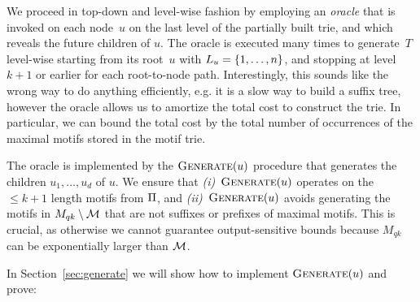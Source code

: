 We proceed in top-down and level-wise fashion by employing an \emph{oracle} that is invoked on each node~$u$ on the last level of the partially built trie, and which reveals the future children of $u$. The oracle is executed many times to generate~$T$ level-wise starting from its root~$u$ with $L_{u} = \{1,\dots, n\}$, and stopping at level $k+1$ or earlier for each root-to-node path. 
Interestingly, this sounds like the wrong way to do anything efficiently, e.g. it is a slow way to build a suffix tree, however the oracle allows us to amortize the total cost to construct the trie. In particular, we can bound the total cost by the total number of occurrences of the maximal motifs stored in the motif trie. 


The oracle is implemented by the $\operatorname{\textsc{Generate}}(u)$ procedure that generates the children $u_1, \ldots, u_d$ of $u$. We ensure that \emph{(i)}~$\operatorname{\textsc{Generate}}(u)$ operates on the $\leq k+1$ length motifs from $\Pi$, and \emph{(ii)}~$\operatorname{\textsc{Generate}}(u)$ avoids generating the motifs in $M_{qk} \setminus \mathcal{M}$ that are not suffixes or prefixes of maximal motifs. This is crucial, as otherwise we cannot guarantee output-sensitive bounds because $M_{qk}$ can be exponentially larger than $\mathcal{M}$.

In Section~\ref{sec:generate} we will show how to implement $\operatorname{\textsc{Generate}}(u)$ and  prove:

